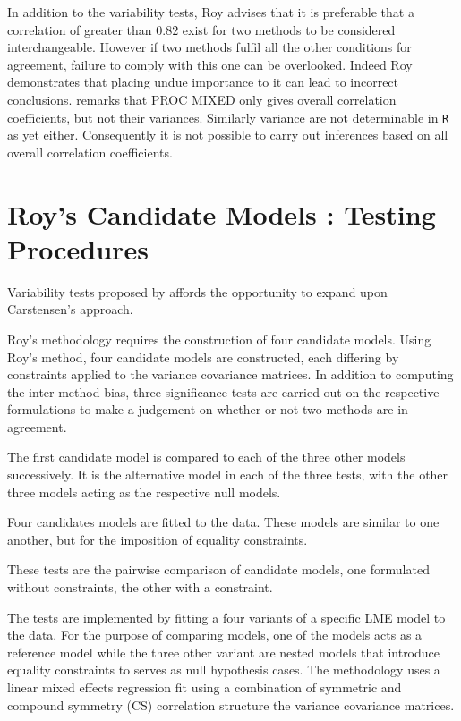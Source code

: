 \documentclass[12pt, a4paper]{report}
\theoremstyle{plain}
\theoremstyle{definition}
\theoremstyle{remark}
\begin{document}
In addition to the variability tests, Roy advises that it is preferable that a correlation of greater than $0.82$ exist for two methods to be considered interchangeable. However if two methods fulfil all the other conditions for agreement, failure to comply with this one can be overlooked. Indeed Roy demonstrates that placing undue importance to it can lead to incorrect conclusions.
\citet{roy} remarks that PROC MIXED only gives overall correlation coefficients, but not their variances. Similarly variance are not determinable in \texttt{R} as yet either. Consequently it is not possible to carry out inferences based on all overall correlation coefficients.


\section{Roy's Candidate Models : Testing Procedures}
Variability tests proposed by \citet{ARoy2009} affords the opportunity to expand upon Carstensen's approach.

Roy's methodology requires the construction of four candidate models. 
Using Roy's method, four candidate models are constructed, each differing by constraints applied to the variance covariance matrices. In addition to computing the inter-method bias, three significance tests are carried out on the respective formulations to make a judgement on whether or not two methods are in agreement.

The first candidate model is compared to each of the three other models successively. It is the alternative model in each of the three tests, with the other three models acting as the respective null models.

Four candidates models are fitted to the data. These models are similar to one another, but for the imposition of equality constraints.

These tests are the pairwise comparison of candidate models, one formulated without constraints, the other with a constraint.

\bigskip
The tests are implemented by fitting a four variants of a specific LME model to the data. For the purpose of comparing models, one of the models acts as a reference model while the three other variant are nested models that introduce equality constraints to serves as null hypothesis cases. The methodology uses a linear mixed effects regression fit using a combination of symmetric and 
compound symmetry (CS) correlation structure the variance covariance matrices.
\end{document}
